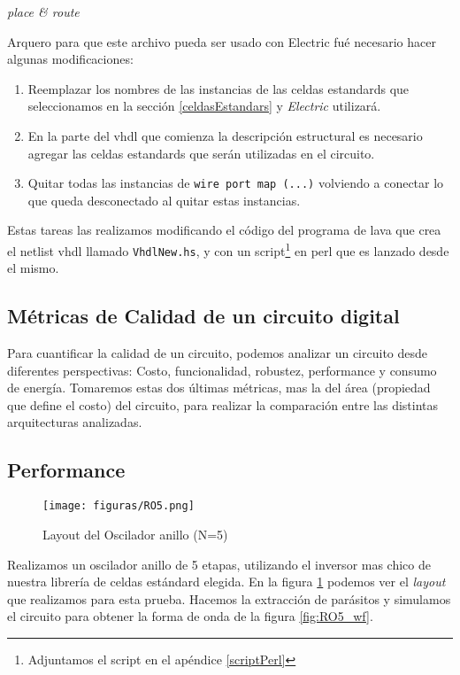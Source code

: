 \emph{place \& route}



Arquero para que este archivo pueda ser usado con Electric fué necesario hacer algunas modificaciones:
\begin{enumerate}
\item Reemplazar los nombres de las instancias de las celdas estandards que  seleccionamos en la sección \ref{celdasEstandars} y \emph{Electric} utilizará.
\item En la parte del vhdl que comienza la descripción estructural es necesario agregar las celdas estandards que serán utilizadas en el circuito.
\item Quitar todas las instancias de \verb|wire port map (...)| volviendo a conectar lo que queda desconectado al quitar estas instancias.
\end{enumerate}  
Estas tareas las realizamos modificando el código del programa de lava que crea el netlist vhdl llamado \verb|VhdlNew.hs|, y con un script\footnote{Adjuntamos el script en el apéndice \ref{scriptPerl}} en perl que es lanzado desde el mismo.
\subsection{Métricas de Calidad de un circuito digital}

Para cuantificar la calidad de un circuito, podemos analizar un circuito desde diferentes perspectivas: Costo, funcionalidad, robustez, performance y consumo de energía. Tomaremos estas dos últimas métricas, mas la del área (propiedad que define el costo) del circuito, para realizar la comparación entre las distintas arquitecturas analizadas.

\subsection{Performance}

\begin{figure}[h!]
\vspace{-5pt}
  \centering
\texttt{[image: figuras/RO5.png]}
  \caption{Layout del Oscilador anillo (N=5)}
\label{fig:RO5_lay}
\vspace{-10pt}
\end{figure}

Realizamos un oscilador anillo de 5 etapas, utilizando el inversor mas chico de nuestra librería de celdas estándard elegida. En la figura \ref{fig:RO5_lay} podemos ver el \emph{layout} que realizamos para esta prueba. Hacemos la extracción de parásitos y simulamos el circuito para obtener la forma de onda de la figura \ref{fig:RO5_wf}.

